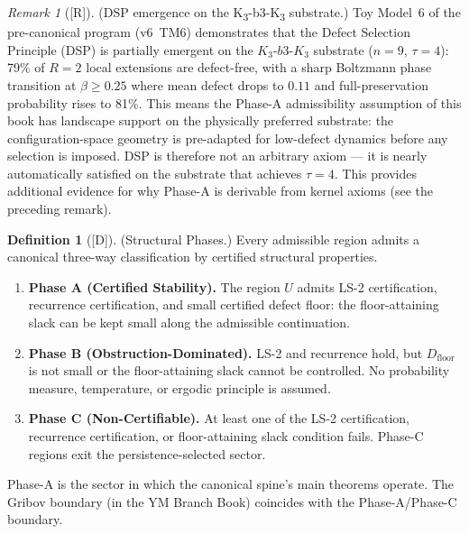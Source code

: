 \documentclass[12pt,oneside]{amsbook}
\theoremstyle{plain}
\theoremstyle{definition}
\newtheorem{definition}[theorem]{Definition}
\theoremstyle{remark}
\newtheorem{remark}[theorem]{Remark}
\newcommand{\status}[1]{\textup{[#1]}}
\begin{document}
\begin{remark}[\status{R}]
\textup{(DSP emergence on the K\textsubscript{3}-b3-K\textsubscript{3} substrate.)}
Toy Model~6 of the pre-canonical program (v6~TM6) demonstrates that
the Defect Selection Principle (DSP) is partially emergent on the
$K_3\text{-}b3\text{-}K_3$ substrate ($n=9$, $\tau=4$): 79\% of
$R=2$ local extensions are defect-free, with a sharp Boltzmann phase
transition at $\beta \geq 0.25$ where mean defect drops to $0.11$
and full-preservation probability rises to 81\%.  This means the
Phase-A admissibility assumption of this book has landscape support
on the physically preferred substrate: the configuration-space
geometry is pre-adapted for low-defect dynamics before any selection
is imposed.  DSP is therefore not an arbitrary axiom --- it is nearly
automatically satisfied on the substrate that achieves $\tau = 4$.
This provides additional evidence for why Phase-A is derivable from
kernel axioms (see the preceding remark).
\end{remark}

\begin{definition}[\status{D}]\label{def:structural-phases}
\textup{(Structural Phases.)}  Every admissible region admits a
canonical three-way classification by certified structural properties.
\begin{enumerate}[label=\textup{(\Alph*)}]
  \item\label{phase-A}
        \textbf{Phase A (Certified Stability).}  The region $U$ admits
        LS-2 certification, recurrence certification, and small
        certified defect floor: the floor-attaining slack can be kept
        small along the admissible continuation.
  \item\label{phase-B}
        \textbf{Phase B (Obstruction-Dominated).}  LS-2 and recurrence
        hold, but $D_{\mathrm{floor}}$ is not small or the
        floor-attaining slack cannot be controlled.  No probability
        measure, temperature, or ergodic principle is assumed.
  \item\label{phase-C}
        \textbf{Phase C (Non-Certifiable).}  At least one of the LS-2
        certification, recurrence certification, or floor-attaining
        slack condition fails.  Phase-C regions exit the
        persistence-selected sector.
\end{enumerate}
Phase-A is the sector in which the canonical spine's main theorems
operate.  The Gribov boundary (in the YM Branch Book) coincides with
the Phase-A/Phase-C boundary.
\end{definition}
\end{document}
